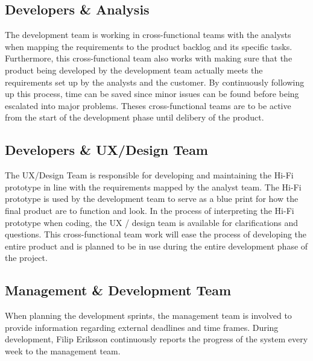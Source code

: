 \subsection{Developers \& Analysis}
The development team is working in cross-functional teams with the analysts when mapping the requirements to the product backlog and its specific tasks. Furthermore, this cross-functional team also works with making sure that the product being developed by the development team actually meets the requirements set up by the analysts and the customer. By continuously following up this process, time can be saved since minor issues can be found before being escalated into major problems. Theses cross-functional teams are to be active from the start of the development phase until delibery of the product. 

\subsection{Developers \& UX/Design Team}
The UX/Design Team is responsible for developing and maintaining the Hi-Fi prototype in line with the requirements mapped by the analyst team. The Hi-Fi prototype is used by the development team to serve as a blue print for how the final product are to function and look. In the process of interpreting the Hi-Fi prototype when coding, the UX / design team is available for clarifications and questions. This cross-functional team work will ease the process of developing the entire product and is planned to be in use during the entire development phase of the project. 

\subsection{Management \& Development Team}
When planning the development sprints, the management team is involved to provide information regarding external deadlines and time frames. During development, Filip Eriksson continuously reports the progress of the system every week to the management team. 
